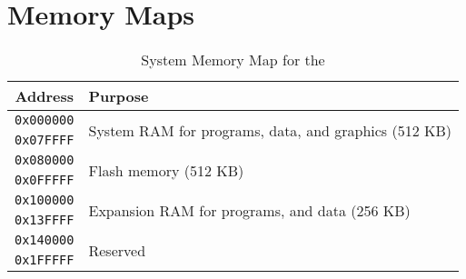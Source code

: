 \chapter{Memory Maps}

\begin{table}[ht]
    \begin{center}
        \begin{tabular}{|c|l|} \hline
            Address & Purpose \\ \hline\hline
            \verb+0x000000+ & \multirow{2}{*}{System RAM for programs, data, and graphics (512 KB)} \\ \cline{1-1}
            \verb+0x07FFFF+ & \\ \hline
            \verb+0x080000+ & \multirow{2}{*}{Flash memory (512 KB)} \\ \cline{1-1}
            \verb+0x0FFFFF+ & \\ \hline
            \verb+0x100000+ & \multirow{2}{*}{Expansion RAM for programs, and data (256 KB)} \\ \cline{1-1}
            \verb+0x13FFFF+ & \\ \hline
            \verb+0x140000+ & \multirow{2}{*}{Reserved} \\ \cline{1-1}
            \verb+0x1FFFFF+ & \\ \hline
        \end{tabular}
    \end{center}
    \caption{System Memory Map for the \jr}
    \label{tab:sys_mem_map}
\end{table}


